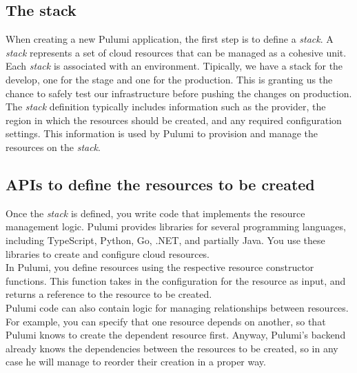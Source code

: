 \subsection{The stack}
When creating a new Pulumi application, the first step is to define a \textit{stack}.
A \textit{stack} represents a set of cloud resources that can be managed as a cohesive unit.\\
Each \textit{stack} is associated with an environment.
Tipically, we have a stack for the develop, one for the stage and one for the production.
This is granting us the chance to safely test our infrastructure before pushing the changes on production.\\
The \textit{stack} definition typically includes information such as the provider, the region in which the resources should be created, and any required configuration settings.
This information is used by Pulumi to provision and manage the resources on the \textit{stack}.

\subsection{APIs to define the resources to be created}
Once the \textit{stack} is defined, you write code that implements the resource management logic.
Pulumi provides libraries for several programming languages, including TypeScript, Python, Go, .NET, and partially Java.
You use these libraries to create and configure cloud resources.\\
In Pulumi, you define resources using the respective resource constructor functions.
This function takes in the configuration for the resource as input, and returns a reference to the resource to be created.\\
Pulumi code can also contain logic for managing relationships between resources.
For example, you can specify that one resource depends on another, so that Pulumi knows to create the dependent resource first.
Anyway, Pulumi's backend already knows the dependencies between the resources to be created, so in any case he will manage to reorder their creation in a proper way.

